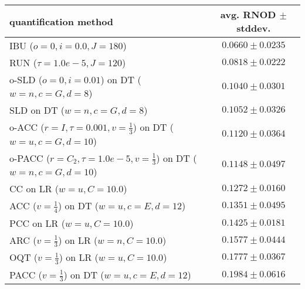 \begin{tabular}{lc}
  \toprule
  quantification method & avg. RNOD $\pm$ stddev. \\
  \midrule
  IBU ($o=0, i=0.0, J=180$) & $\mathbf{0.0660 \pm 0.0235}$ \\
  RUN ($\tau=1.0e-5, J=120$) & $0.0818 \pm 0.0222$ \\
  o-SLD ($o=0, i=0.01$) on DT ($w=n, c=G, d=8$) & $0.1040 \pm 0.0301$ \\
  SLD on DT ($w=n, c=G, d=8$) & $0.1052 \pm 0.0326$ \\
  o-ACC ($r=I, \tau=0.001, v=\frac{1}{3}$) on DT ($w=u, c=G, d=10$) & $0.1120 \pm 0.0364$ \\
  o-PACC ($r=C_2, \tau=1.0e-5, v=\frac{1}{3}$) on DT ($w=n, c=G, d=10$) & $0.1148 \pm 0.0497$ \\
  CC on LR ($w=u, C=10.0$) & $0.1272 \pm 0.0160$ \\
  ACC ($v=\frac{1}{4}$) on DT ($w=u, c=E, d=12$) & $0.1351 \pm 0.0495$ \\
  PCC on LR ($w=u, C=10.0$) & $0.1425 \pm 0.0181$ \\
  ARC ($v=\frac{1}{3}$) on LR ($w=n, C=10.0$) & $0.1577 \pm 0.0444$ \\
  OQT ($v=\frac{1}{3}$) on LR ($w=u, C=10.0$) & $0.1777 \pm 0.0367$ \\
  PACC ($v=\frac{1}{3}$) on DT ($w=u, c=E, d=12$) & $0.1984 \pm 0.0616$ \\
  \bottomrule
\end{tabular}
